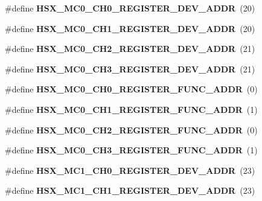 \begin{DoxyCompactItemize}
\item 
\#define {\bfseries H\+S\+X\+\_\+\+M\+C0\+\_\+\+C\+H0\+\_\+\+R\+E\+G\+I\+S\+T\+E\+R\+\_\+\+D\+E\+V\+\_\+\+A\+D\+D\+R}~(20)\label{types_8h_a9b7316bd4085ecb228a3162e44418302}

\item 
\#define {\bfseries H\+S\+X\+\_\+\+M\+C0\+\_\+\+C\+H1\+\_\+\+R\+E\+G\+I\+S\+T\+E\+R\+\_\+\+D\+E\+V\+\_\+\+A\+D\+D\+R}~(20)\label{types_8h_ac66829c4c41afd34d9d0544e29a0e928}

\item 
\#define {\bfseries H\+S\+X\+\_\+\+M\+C0\+\_\+\+C\+H2\+\_\+\+R\+E\+G\+I\+S\+T\+E\+R\+\_\+\+D\+E\+V\+\_\+\+A\+D\+D\+R}~(21)\label{types_8h_a22c6d67f1ee7817e813715f94ca7a73c}

\item 
\#define {\bfseries H\+S\+X\+\_\+\+M\+C0\+\_\+\+C\+H3\+\_\+\+R\+E\+G\+I\+S\+T\+E\+R\+\_\+\+D\+E\+V\+\_\+\+A\+D\+D\+R}~(21)\label{types_8h_a53794d5b5631c9a1e7ebe9809a5c3993}

\item 
\#define {\bfseries H\+S\+X\+\_\+\+M\+C0\+\_\+\+C\+H0\+\_\+\+R\+E\+G\+I\+S\+T\+E\+R\+\_\+\+F\+U\+N\+C\+\_\+\+A\+D\+D\+R}~(0)\label{types_8h_ac3f40f3476190aec6996e1ffd1da3c18}

\item 
\#define {\bfseries H\+S\+X\+\_\+\+M\+C0\+\_\+\+C\+H1\+\_\+\+R\+E\+G\+I\+S\+T\+E\+R\+\_\+\+F\+U\+N\+C\+\_\+\+A\+D\+D\+R}~(1)\label{types_8h_a5690c21a52958fe28e7871189d547280}

\item 
\#define {\bfseries H\+S\+X\+\_\+\+M\+C0\+\_\+\+C\+H2\+\_\+\+R\+E\+G\+I\+S\+T\+E\+R\+\_\+\+F\+U\+N\+C\+\_\+\+A\+D\+D\+R}~(0)\label{types_8h_ae4a27dd0916339108858f7bdbd326e91}

\item 
\#define {\bfseries H\+S\+X\+\_\+\+M\+C0\+\_\+\+C\+H3\+\_\+\+R\+E\+G\+I\+S\+T\+E\+R\+\_\+\+F\+U\+N\+C\+\_\+\+A\+D\+D\+R}~(1)\label{types_8h_ad76e5a152d2d76ace9bac013487e664e}

\item 
\#define {\bfseries H\+S\+X\+\_\+\+M\+C1\+\_\+\+C\+H0\+\_\+\+R\+E\+G\+I\+S\+T\+E\+R\+\_\+\+D\+E\+V\+\_\+\+A\+D\+D\+R}~(23)\label{types_8h_a57e3b1424a04c402463db9cca9323c1b}

\item 
\#define {\bfseries H\+S\+X\+\_\+\+M\+C1\+\_\+\+C\+H1\+\_\+\+R\+E\+G\+I\+S\+T\+E\+R\+\_\+\+D\+E\+V\+\_\+\+A\+D\+D\+R}~(23)\label{types_8h_a9d46ab436c323c909918a3287c1c4c7f}


\end{DoxyCompactItemize}
